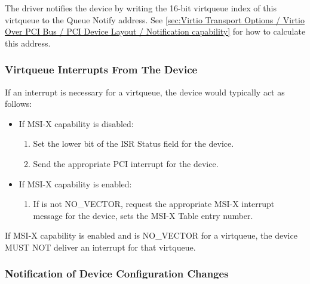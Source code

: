 The driver notifies the device by writing the 16-bit virtqueue index
of this virtqueue to the Queue Notify address.  See \ref{sec:Virtio Transport Options / Virtio Over PCI Bus / PCI Device Layout / Notification capability} for how to calculate this address.

\subsubsection{Virtqueue Interrupts From The Device}\label{sec:Virtio Transport Options / Virtio Over PCI Bus / PCI-specific Initialization And Device Operation / Virtqueue Interrupts From The Device}

If an interrupt is necessary for a virtqueue, the device would typically act as follows:

\begin{itemize}
  \item If MSI-X capability is disabled:
    \begin{enumerate}
    \item Set the lower bit of the ISR Status field for the device.

    \item Send the appropriate PCI interrupt for the device.
    \end{enumerate}

  \item If MSI-X capability is enabled:
    \begin{enumerate}
    \item If  is not NO_VECTOR,
      request the appropriate MSI-X interrupt message for the
      device,  sets the MSI-X Table entry
      number.
    \end{enumerate}
\end{itemize}


If MSI-X capability is enabled and  is
NO_VECTOR for a virtqueue, the device MUST NOT deliver an interrupt
for that virtqueue.

\subsubsection{Notification of Device Configuration Changes}\label{sec:Virtio Transport Options / Virtio Over PCI Bus / PCI-specific Initialization And Device Operation / Notification of Device Configuration Changes}

